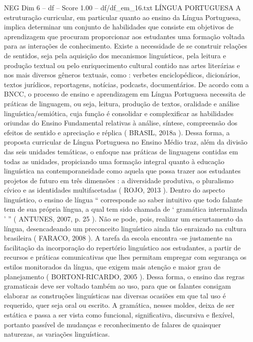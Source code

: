 \begin{textsample}{NEG Dim 6 – df – Score 1.00 – df/df\_em\_16.txt}  \label{ex:f6_neg_162}
LÍNGUA PORTUGUESA A estruturação curricular, em particular quanto ao ensino da Língua Portuguesa, implica determinar um conjunto de habilidades que consiste em objetivos de aprendizagem que procuram proporcionar aos estudantes uma formação voltada para as interações de conhecimento.
Existe a necessidade de se construir relações de sentidos, seja pela aquisição dos mecanismos linguísticos, pela leitura e produção textual ou pelo enriquecimento cultural contido nas artes literárias e nos mais diversos gêneros textuais, como : verbetes enciclopédicos, dicionários, textos jurídicos, reportagens, notícias, podcasts, documentários.
De acordo com a BNCC, o processo de ensino e aprendizagem em Língua Portuguesa necessita de práticas de linguagem, ou seja, leitura, produção de textos, oralidade e análise linguística/semiótica, cuja função é consolidar e complexificar as habilidades oriundas do Ensino Fundamental relativas à análise, síntese, compreensão dos efeitos de sentido e apreciação e réplica ( BRASIL, 2018a ).
Dessa forma, a proposta curricular de Língua Portuguesa no Ensino Médio traz, além da divisão das seis unidades temáticas, o enfoque nas práticas de linguagens contidas em todas as unidades, propiciando uma formação integral quanto à educação linguística na contemporaneidade como aquela que possa trazer aos estudantes projetos de futuro em três dimensões : a diversidade produtiva, o pluralismo cívico e as identidades multifacetadas ( ROJO, 2013 ).
Dentro do aspecto linguístico, o ensino de língua “ corresponde ao saber intuitivo que todo falante tem de sua própria língua, a qual tem sido chamada de ‘ gramática internalizada ’ ” ( ANTUNES, 2007, p. 25 ).
Não se pode, pois, realizar um encurtamento da língua, desencadeando um preconceito linguístico ainda tão enraizado na cultura brasileira ( FARACO, 2008 ).
A tarefa da escola encontra -se justamente na facilitação da incorporação do repertório linguístico aos estudantes, a partir de recursos e práticas comunicativas que lhes permitam empregar com segurança os estilos monitorados da língua, que exigem mais atenção e maior grau de planejamento ( BORTONI-RICARDO, 2005 ).
Dessa forma, o ensino das regras gramaticais deve ser voltado também ao uso, para que os falantes consigam elaborar as construções linguísticas nas diversas ocasiões em que tal uso é requerido, quer seja oral ou escrito.
A gramática, nesses moldes, deixa de ser estática e passa a ser vista como funcional, significativa, discursiva e flexível, portanto passível de mudanças e reconhecimento de falares de quaisquer naturezas, as variações linguísticas.

\end{textsample}
